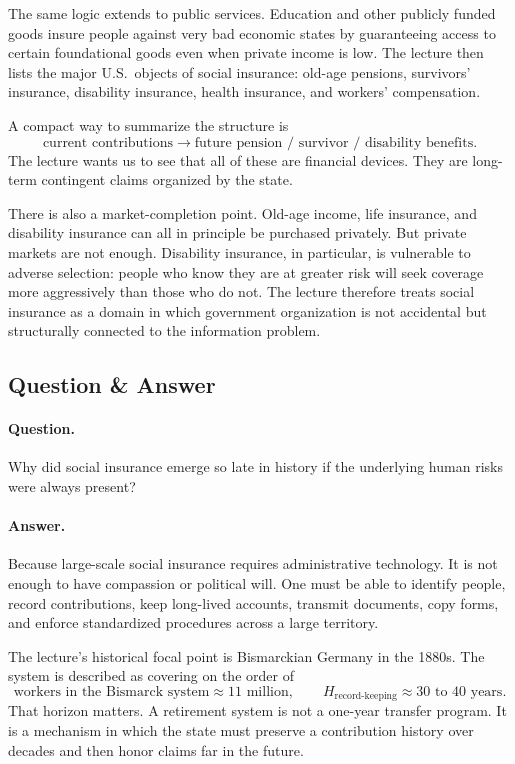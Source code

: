 The same logic extends to public services. Education and other publicly funded goods insure people against very bad economic states by guaranteeing access to certain foundational goods even when private income is low. The lecture then lists the major U.S.\ objects of social insurance: old-age pensions, survivors' insurance, disability insurance, health insurance, and workers' compensation.

A compact way to summarize the structure is
\begin{equation}
\text{current contributions} \longrightarrow \text{future pension / survivor / disability benefits}.
\end{equation}
The lecture wants us to see that all of these are financial devices. They are long-term contingent claims organized by the state.

There is also a market-completion point. Old-age income, life insurance, and disability insurance can all in principle be purchased privately. But private markets are not enough. Disability insurance, in particular, is vulnerable to adverse selection: people who know they are at greater risk will seek coverage more aggressively than those who do not. The lecture therefore treats social insurance as a domain in which government organization is not accidental but structurally connected to the information problem.

\subsection{Question \& Answer}

\paragraph{Question.} Why did social insurance emerge so late in history if the underlying human risks were always present?

\paragraph{Answer.} Because large-scale social insurance requires administrative technology. It is not enough to have compassion or political will. One must be able to identify people, record contributions, keep long-lived accounts, transmit documents, copy forms, and enforce standardized procedures across a large territory.

The lecture's historical focal point is Bismarckian Germany in the 1880s. The system is described as covering on the order of
\begin{equation}
\text{workers in the Bismarck system} \approx 11\text{ million},
\qquad
H_{\text{record-keeping}} \approx 30\text{ to }40\text{ years}.
\end{equation}
That horizon matters. A retirement system is not a one-year transfer program. It is a mechanism in which the state must preserve a contribution history over decades and then honor claims far in the future.

